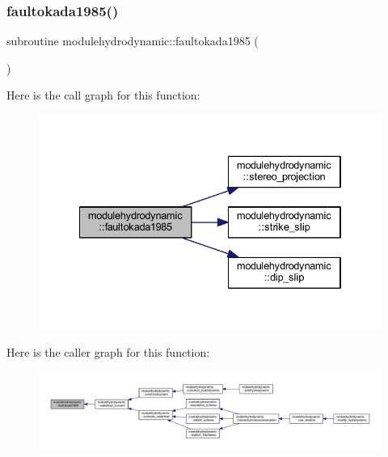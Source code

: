 \subsubsection{\texorpdfstring{faultokada1985()}{faultokada1985()}}
{\footnotesize\ttfamily subroutine modulehydrodynamic\+::faultokada1985 (\begin{DoxyParamCaption}{ }\end{DoxyParamCaption})\hspace{0.3cm}{\ttfamily [private]}}

Here is the call graph for this function\+:\nopagebreak
\begin{figure}[H]
\begin{center}
\leavevmode
\includegraphics[width=334pt]{namespacemodulehydrodynamic_af90f1292b4b75aa67f18563e3030e056_cgraph}
\end{center}
\end{figure}
Here is the caller graph for this function\+:\nopagebreak
\begin{figure}[H]
\begin{center}
\leavevmode
\includegraphics[width=350pt]{namespacemodulehydrodynamic_af90f1292b4b75aa67f18563e3030e056_icgraph}
\end{center}
\end{figure}
\mbox{\label{namespacemodulehydrodynamic_a9de56e052f0a5f85cbbcbac9a2f0f95a}} 
